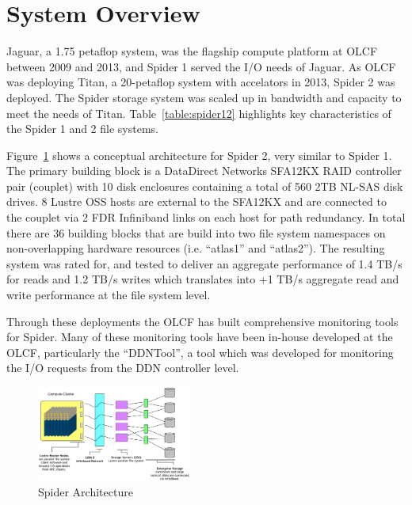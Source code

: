 \section{System Overview}
\label{sec:overview}

Jaguar, a 1.75 petaflop system, was the flagship compute platform at OLCF between
2009 and 2013, and Spider 1 served the I/O needs of Jaguar. As OLCF was
deploying Titan, a 20-petaflop system with accelators in 2013, Spider 2 was
deployed. The Spider storage system was scaled up in bandwidth and capacity 
to meet the needs of Titan. Table~\ref{table:spider12} highlights key 
characteristics of the Spider 1 and 2 file systems. 


Figure~\ref{fig:arch} shows a conceptual architecture for Spider 2, very similar to Spider 1. 
The primary building block is a DataDirect Networks SFA12KX RAID controller
pair (couplet) with 10 disk enclosures containing a total of 560 2TB NL-SAS disk drives.
8 Lustre OSS hosts are external to the SFA12KX and are connected to the couplet
via 2 FDR Infiniband links on each host for path redundancy. In total there are
36 building blocks that are build into two file system namespaces on
non-overlapping hardware resources (i.e. ``atlas1'' and ``atlas2''). The
resulting system was rated for, and tested to deliver an aggregate performance of 1.4 TB/s
for reads and 1.2 TB/s writes which translates into +1 TB/s aggregate read and
write performance at the file system level.



Through these deployments the OLCF has built comprehensive
monitoring tools for Spider\cite{ddntool10:ross}. Many of these monitoring
tools have been in-house developed at the OLCF, particularly the ``DDNTool'', a
tool which was developed for monitoring the I/O requests from the DDN
controller level. 



\begin{figure}[!t]
\centering
\includegraphics[width=0.45\textwidth]{./figs/spider2arch.ps}
\vspace{-0.1in}
\centering
\caption{Spider Architecture}
\label{fig:arch}
\end{figure}

